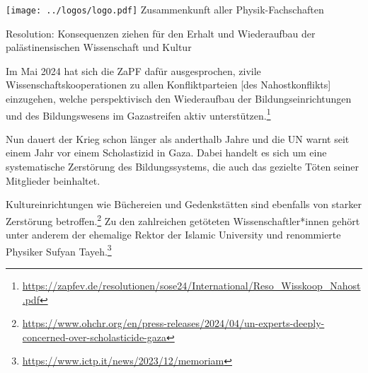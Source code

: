 \documentclass[DIV=calc]{scrartcl}
\let\oldgrqq=\grqq
\def\grqq{\oldgrqq\xspace}
\begin{document}
\hspace{0.87\textwidth}
\begin{minipage}{120pt}
	\vspace{-1.8cm}
	\texttt{[image: ../logos/logo.pdf]}
	\centering
	\small Zusammenkunft aller Physik-Fachschaften
\end{minipage}

\begin{center}
  \huge{Resolution: Konsequenzen ziehen für den Erhalt und Wiederaufbau der palästinensischen Wissenschaft und Kultur}
  \vspace{.25\baselineskip}
  \normalsize
\end{center}
\vspace{1cm}







Im Mai 2024 hat sich die ZaPF dafür ausgesprochen, \glqq zivile Wissenschaftskooperationen zu allen Konfliktparteien [des Nahostkonflikts] einzugehen\grqq{}, welche \glqq perspektivisch den Wiederaufbau der Bildungseinrichtungen und des Bildungswesens im Gazastreifen aktiv unterstützen\grqq{}.\footnote{\label{note1}\url{https://zapfev.de/resolutionen/sose24/International/Reso_Wisskoop_Nahost.pdf}}

Nun dauert der Krieg schon länger als anderthalb Jahre und die UN warnt seit einem Jahr vor einem Scholastizid in Gaza. Dabei handelt es sich um eine systematische Zerstörung des Bildungssystems, die auch das gezielte Töten seiner Mitglieder beinhaltet.

Kultureinrichtungen wie Büchereien und Gedenkstätten sind ebenfalls von starker Zerstörung betroffen.\footnote{\label{note2}\url{https://www.ohchr.org/en/press-releases/2024/04/un-experts-deeply-concerned-over-scholasticide-gaza}} Zu den zahlreichen getöteten Wissenschaftler*innen gehört unter anderem der ehemalige Rektor der Islamic University und renommierte Physiker Sufyan Tayeh.\footnote{\label{note3}\url{https://www.ictp.it/news/2023/12/memoriam}}
\end{document}
